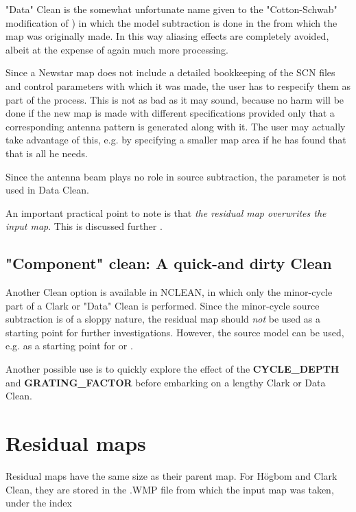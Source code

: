 	"Data" Clean is the somewhat unfortunate name given to the
"Cotton-Schwab" modification of ) in which the
model subtraction is done in the  from which
the map was originally made.  In this way aliasing effects are completely
avoided, albeit at the expense of again much more processing.

	Since a Newstar map does not include a detailed bookkeeping of the SCN
files and control parameters with which it was made, the user has to respecify
them as part of the process.  This is not as bad as it may sound, because no
harm will be done if the new map is made with different specifications provided
only that a corresponding antenna pattern is generated along with it.  The user
may actually take advantage of this, e.g.  by specifying a smaller map area if
he has found that that is all he needs.

	Since the antenna beam plays no role in source subtraction, the
 parameter is not used in Data Clean.

	An important practical point to note is that {\em the residual map
overwrites the input map}. This is discussed further
.


\subsection{"Component" clean: A quick-and dirty Clean}
\label{.compon}

	Another Clean option is available in NCLEAN, in which only the
minor-cycle part of a Clark or "Data" Clean is performed.  Since the
minor-cycle source subtraction is of a sloppy nature, the residual map should
{\em not} be used as a starting point for further investigations. However, the
source model can be used, e.g.  as a starting point for
 or .

	Another possible use is to quickly explore the effect of the {\bf
CYCLE\_DEPTH} and {\bf GRATING\_FACTOR}
 before embarking on a lengthy Clark or Data
Clean.


\section{ Residual maps}
\label{.residual.maps}

	Residual maps have the same size as their parent map. For H\"ogbom and
Clark Clean, they are stored in the .WMP file from which the input map was
taken, under the index

